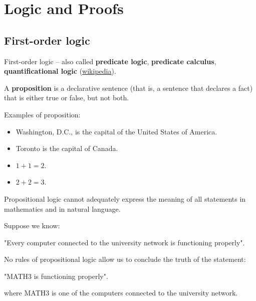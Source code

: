 \chapter{Logic and Proofs}

\section{First-order logic}

First-order logic -- also called \textbf{predicate logic}, \textbf{predicate calculus}, \textbf{quantificational logic} (\href{https://en.wikipedia.org/wiki/First-order_logic}{wikipedia}).   

\begin{definition}[Proposition]
    A \textbf{proposition} is a declarative sentence (that is, a sentence that declares a fact) that is either true or false, but not both.
\end{definition}

\begin{eg}
    Examples of proposition:

    \begin{itemize}
        \item Washington, D.C., is the capital of the United States of America.
        \item Toronto is the capital of Canada.
        \item \(1 + 1 = 2\).
        \item \(2 + 2 = 3\).  
    \end{itemize}
\end{eg}


Propositional logic cannot adequately express the meaning of all statements in mathematics and in natural language.

\begin{eg}
    Suppose we know:

    "Every computer connected to the university network is functioning properly".

    No rules of propositional logic allow us to conclude the truth of the statement:

    "MATH3 is functioning properly".

    where MATH3 is one of the computers connected to the university network.
\end{eg}